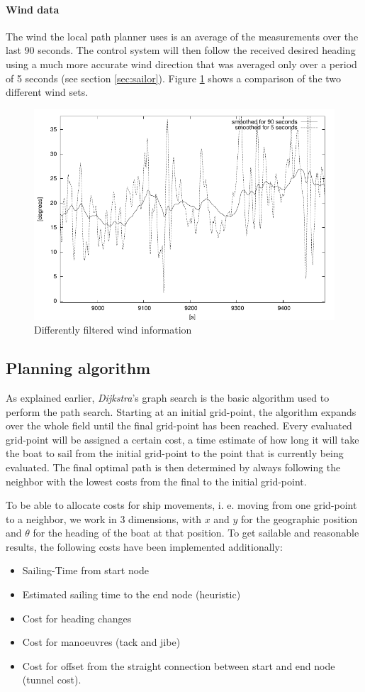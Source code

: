 \paragraph{Wind data}
The wind the local path planner uses is an average of the measurements over the last 90 seconds. The control system will then follow the received desired heading using a much more accurate wind direction that was averaged only over a period of 5 seconds (see section \ref{sec:sailor}). Figure \ref{fig:cleanwind} shows a comparison of the two different wind sets.
%
\begin{figure}
 \centering
 \includegraphics[width = 6.5 cm]{pics/paper_cleanwind.pdf}
 \caption{Differently filtered wind information}
 \label{fig:cleanwind}
\end{figure}

%
\subsection{Planning algorithm}
As explained earlier, \textit{Dijkstra}'s graph search is the basic algorithm
used to perform the path search. Starting at an initial grid-point, the algorithm expands over the whole field until the final grid-point has been reached. Every evaluated grid-point will be assigned a certain cost, a time estimate of how long it will take the boat to sail from the initial grid-point to the point that is currently being evaluated. The final optimal path is then determined by always following the neighbor with the lowest costs from the final to the initial grid-point. 

To be able to allocate costs for ship movements, i. e. moving from one grid-point to a neighbor, we work in 3 dimensions, with $x$ and $y$ for the geographic position
and $\theta$ for the heading of the boat at that position. To get sailable and
reasonable results, the following costs have been implemented additionally:
%
\begin{itemize}
\item Sailing-Time from start node
\item Estimated sailing time to the end node (heuristic)
\item Cost for heading changes
\item Cost for manoeuvres (tack and jibe)
\item Cost for offset from the straight connection between start and end node (tunnel cost).
\end{itemize}
%
